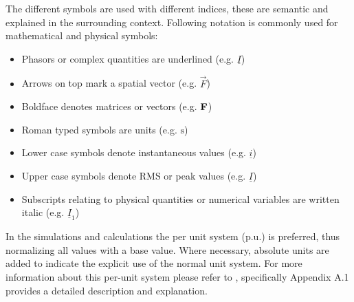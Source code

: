 The different symbols are used with different indices, these are semantic and explained in the surrounding context. Following notation is commonly used for mathematical and physical symbols:
\begin{itemize}[noitemsep]
    \item Phasors or complex quantities are underlined (e.g. $\underline{I}$)
    \item Arrows on top mark a spatial vector (e.g. $\overrightarrow{F}$)
    \item Boldface denotes matrices or vectors (e.g. $\mathrm{\textbf{F}}$)
    \item Roman typed symbols are units (e.g. $\mathrm{s}$)
    \item Lower case symbols denote instantaneous values (e.g. $\underline{i}$)
    \item Upper case symbols denote \acs{RMS} or peak values (e.g. $\underline{I}$)
    \item Subscripts relating to physical quantities or numerical variables are written italic (e.g. $\underline{I}_1$) 
\end{itemize}

In the simulations and calculations the per unit system ($\mathrm{p.u.}$) is preferred, thus normalizing all values with a base value. Where necessary, absolute units are added to indicate the explicit use of the normal unit system. For more information about this per-unit system please refer to \textcite{machowskiPowerSystemDynamics2020}, specifically Appendix A.1 provides a detailed description and explanation.